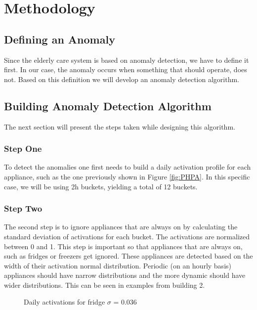 \section{Methodology}

\subsection{Defining an Anomaly}

Since the elderly care system is based on anomaly detection, we have to define it first.
In our case, the anomaly occurs when something that should operate, does not. 
Based on this definition we will develop an anomaly detection algorithm. 

\subsection{Building Anomaly Detection Algorithm}

The next section will present the steps taken while designing this algorithm.

\subsubsection{Step One}
To detect the anomalies one first needs to build a daily activation profile for each appliance, such as the one previously shown in Figure \ref{fig:PHPA}.
In this specific case, we will be using 2h buckets, yielding a total of 12 buckets. 

\subsubsection{Step Two}
The second step is to ignore appliances that are always on by calculating the standard deviation of activations for each bucket. 
The activations are normalized between 0 and 1. 
This step is important so that appliances that are always on, such as fridges or freezers get ignored. 
These appliances are detected based on the width of their activation normal distribution. 
Periodic (on an hourly basis) appliances should have narrow distributions and the more dynamic should have wider distributions.
This can be seen in examples from building 2.
\begin{figure}[H]
    \centering
    \caption{Daily activations for fridge $\sigma$ = 0.036}
    \label{arr:fridge_acts}
\end{figure}


